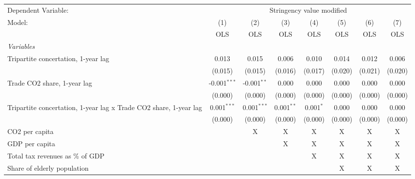 
\begingroup
\centering
\begin{tabular}{lccccccc}
   \toprule
   Dependent Variable: & \multicolumn{7}{c}{Stringency value modified}\\
   Model:                                                            & (1)            & (2)           & (3)          & (4)         & (5)     & (6)     & (7)\\  
                                                                     &  OLS           & OLS           & OLS          & OLS         & OLS     & OLS     & OLS\\  
   \midrule
   \emph{Variables}\\
   Tripartite concertation, 1-year lag                               & 0.013          & 0.015         & 0.006        & 0.010       & 0.014   & 0.012   & 0.006\\   
                                                                     & (0.015)        & (0.015)       & (0.016)      & (0.017)     & (0.020) & (0.021) & (0.020)\\   
   Trade CO2 share, 1-year lag                                       & -0.001$^{***}$ & -0.001$^{**}$ & 0.000        & 0.000       & 0.000   & 0.000   & 0.000\\   
                                                                     & (0.000)        & (0.000)       & (0.000)      & (0.000)     & (0.000) & (0.000) & (0.000)\\   
   Tripartite concertation, 1-year lag x Trade CO2 share, 1-year lag & 0.001$^{***}$  & 0.001$^{***}$ & 0.001$^{**}$ & 0.001$^{*}$ & 0.000   & 0.000   & 0.000\\   
                                                                     & (0.000)        & (0.000)       & (0.000)      & (0.000)     & (0.000) & (0.000) & (0.000)\\   
   CO2 per capita                                                    &                & X             & X            & X           & X       & X       & X\\  
   GDP per capita                                                    &                &               & X            & X           & X       & X       & X\\  
   Total tax revenues as \% of GDP                                   &                &               &              & X           & X       & X       & X\\  
   Share of elderly population                                       &                &               &              &             & X       & X       & X\\  

\end{tabular}
